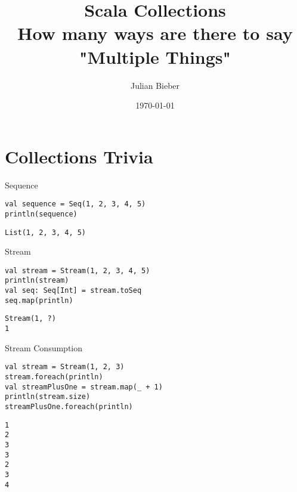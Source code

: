 \documentclass[xcolor=svgnames]{beamer}
\title
[Scala Collections \hspace{2em}]
{Scala Collections \\ How many ways are there to say \\ "Multiple Things"}
\author
[Julian Bieber]
{Julian Bieber}
\date
{\today}
\begin{document}
    \maketitle

    \section{Collections Trivia}

    \begin{frame}[fragile] %
    {Sequence}
        \begin{Verbatim}[formatcom=\sffamily]
val sequence = Seq(1, 2, 3, 4, 5)
println(sequence)
        \end{Verbatim}

        \noindent\makebox[\linewidth]{\rule{\paperwidth}{0.4pt}}

        \pause

        \begin{Verbatim}[formatcom=\sffamily]
List(1, 2, 3, 4, 5)
        \end{Verbatim}
    \end{frame}

    \begin{frame}[fragile] %
    {Stream}
        \begin{Verbatim}[formatcom=\sffamily]
val stream = Stream(1, 2, 3, 4, 5)
println(stream)
val seq: Seq[Int] = stream.toSeq
seq.map(println)
        \end{Verbatim}

        \noindent\makebox[\linewidth]{\rule{\paperwidth}{0.4pt}}

        \pause

        \begin{Verbatim}[formatcom=\sffamily]
Stream(1, ?)
1
        \end{Verbatim}
    \end{frame}

    \begin{frame}[fragile] %
    {Stream Consumption}
        \begin{Verbatim}[formatcom=\sffamily]
val stream = Stream(1, 2, 3)
stream.foreach(println)
val streamPlusOne = stream.map(_ + 1)
println(stream.size)
streamPlusOne.foreach(println)
        \end{Verbatim}

        \noindent\makebox[\linewidth]{\rule{\paperwidth}{0.4pt}}

        \pause

        \begin{Verbatim}[formatcom=\sffamily]
1
2
3
3
2
3
4
        \end{Verbatim}
    \end{frame}
\end{document}
